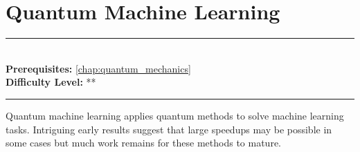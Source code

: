 \documentclass[book.tex]{subfiles}
\begin{document}
\chapter{Quantum Machine Learning}

\label{chap:quantum_machine_learning}
\noindent\rule{11cm}{0.4pt} \\
\textbf{Prerequisites:} \autoref{chap:quantum_mechanics} \\
\textbf{Difficulty Level:} ** \\
\noindent\rule{11cm}{0.4pt}
\vspace{5mm}

Quantum machine learning applies quantum methods to solve machine learning tasks. Intriguing early results suggest that large speedups may be possible in some cases but much work remains for these methods to mature.
\end{document}
